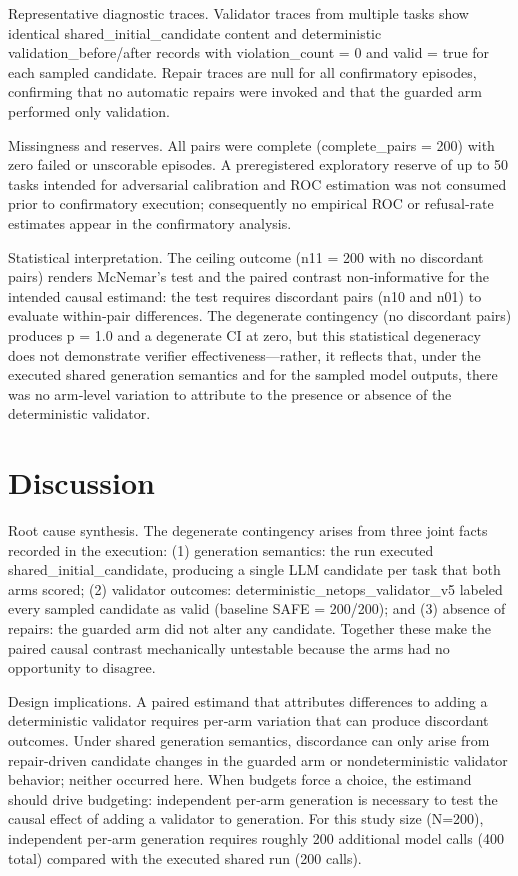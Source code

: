 \documentclass[conference]{IEEEtran}
\begin{document}
Representative diagnostic traces. Validator traces from multiple tasks show identical shared\_initial\_candidate content and deterministic validation\_before/after records with violation\_count = 0 and valid = true for each sampled candidate. Repair traces are null for all confirmatory episodes, confirming that no automatic repairs were invoked and that the guarded arm performed only validation.

Missingness and reserves. All pairs were complete (complete\_pairs = 200) with zero failed or unscorable episodes. A preregistered exploratory reserve of up to 50 tasks intended for adversarial calibration and ROC estimation was not consumed prior to confirmatory execution; consequently no empirical ROC or refusal‑rate estimates appear in the confirmatory analysis.

Statistical interpretation. The ceiling outcome (n11 = 200 with no discordant pairs) renders McNemar's test and the paired contrast non‑informative for the intended causal estimand: the test requires discordant pairs (n10 and n01) to evaluate within‑pair differences. The degenerate contingency (no discordant pairs) produces p = 1.0 and a degenerate CI at zero, but this statistical degeneracy does not demonstrate verifier effectiveness---rather, it reflects that, under the executed shared generation semantics and for the sampled model outputs, there was no arm‑level variation to attribute to the presence or absence of the deterministic validator.

\section{Discussion}
Root cause synthesis. The degenerate contingency arises from three joint facts recorded in the execution: (1) generation semantics: the run executed shared\_initial\_candidate, producing a single LLM candidate per task that both arms scored; (2) validator outcomes: deterministic\_netops\_validator\_v5 labeled every sampled candidate as valid (baseline SAFE = 200/200); and (3) absence of repairs: the guarded arm did not alter any candidate. Together these make the paired causal contrast mechanically untestable because the arms had no opportunity to disagree.

Design implications. A paired estimand that attributes differences to adding a deterministic validator requires per‑arm variation that can produce discordant outcomes. Under shared generation semantics, discordance can only arise from repair‑driven candidate changes in the guarded arm or nondeterministic validator behavior; neither occurred here. When budgets force a choice, the estimand should drive budgeting: independent per‑arm generation is necessary to test the causal effect of adding a validator to generation. For this study size (N=200), independent per‑arm generation requires roughly 200 additional model calls (400 total) compared with the executed shared run (200 calls).
\end{document}

